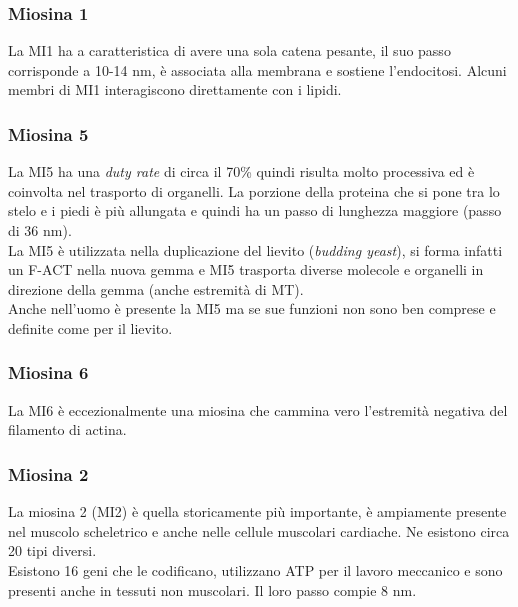         \subsubsection{Miosina 1}
            La MI1 ha a caratteristica di avere una sola catena pesante, il suo passo corrisponde a 10-14 nm, è associata alla membrana e sostiene l'endocitosi. Alcuni membri di MI1 interagiscono direttamente con i lipidi.
            
        \subsubsection{Miosina 5}
            La MI5 ha una \textit{duty rate} di circa il 70\% quindi risulta molto processiva ed è coinvolta nel trasporto di organelli. La porzione della proteina che si pone tra lo stelo e i piedi è più allungata e quindi ha un passo di lunghezza maggiore (passo di 36 nm).\\
            La MI5 è utilizzata nella duplicazione del lievito (\textit{budding yeast}), si forma infatti un F-ACT nella nuova gemma e MI5 trasporta diverse molecole e organelli in direzione della gemma (anche estremità di MT).\\
            Anche nell'uomo è presente la MI5 ma se sue funzioni non sono ben comprese e definite come per il lievito.
            
        \subsubsection{Miosina 6}
            La MI6 è eccezionalmente una miosina che cammina vero l'estremità negativa del filamento di actina.
            
        \subsubsection{Miosina 2}
            La miosina 2 (MI2) è quella storicamente più importante, è ampiamente presente nel muscolo scheletrico e anche nelle cellule muscolari cardiache. Ne esistono circa 20 tipi diversi.    \\
            Esistono 16 geni che le codificano, utilizzano ATP per il lavoro meccanico e sono presenti anche in tessuti non muscolari. Il loro passo compie 8 nm.\\
            
